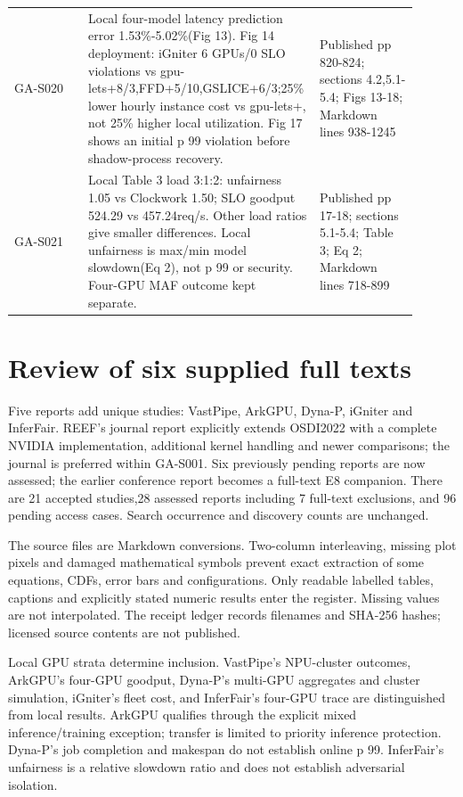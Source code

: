 \documentclass[12pt,a 4paper]{article}
\begin{document}
\begin{longtable}{P{0.18\linewidth}P{0.48\linewidth}P{0.24\linewidth}}
GA-S020 \cite{igniter} & Local four-model latency prediction error 1.53\%-5.02\%(Fig 13). Fig 14 deployment: iGniter 6 GPUs/0 SLO violations vs gpu-lets+8/3,FFD+5/10,GSLICE+6/3;25\% lower hourly instance cost vs gpu-lets+, not 25\% higher local utilization. Fig 17 shows an initial p 99 violation before shadow-process recovery. & Published pp 820-824; sections 4.2,5.1-5.4; Figs 13-18; Markdown lines 938-1245\\
GA-S021 \cite{inferfair} & Local Table 3 load 3:1:2: unfairness 1.05 vs Clockwork 1.50; SLO goodput 524.29 vs 457.24req/s. Other load ratios give smaller differences. Local unfairness is max/min model slowdown(Eq 2), not p 99 or security. Four-GPU MAF outcome kept separate. & Published pp 17-18; sections 5.1-5.4; Table 3; Eq 2; Markdown lines 718-899\\
\bottomrule\end{longtable}
\section{Review of six supplied full texts}
Five reports add unique studies: VastPipe, ArkGPU, Dyna-P, iGniter and InferFair. REEF's journal report explicitly extends OSDI2022 with a complete NVIDIA implementation, additional kernel handling and newer comparisons; the journal is preferred within GA-S001. Six previously pending reports are now assessed; the earlier conference report becomes a full-text E8 companion. There are 21 accepted studies,28 assessed reports including 7 full-text exclusions, and 96 pending access cases. Search occurrence and discovery counts are unchanged.

The source files are Markdown conversions. Two-column interleaving, missing plot pixels and damaged mathematical symbols prevent exact extraction of some equations, CDFs, error bars and configurations. Only readable labelled tables, captions and explicitly stated numeric results enter the register. Missing values are not interpolated. The receipt ledger records filenames and SHA-256 hashes; licensed source contents are not published.

Local GPU strata determine inclusion. VastPipe's NPU-cluster outcomes, ArkGPU's four-GPU goodput, Dyna-P's multi-GPU aggregates and cluster simulation, iGniter's fleet cost, and InferFair's four-GPU trace are distinguished from local results. ArkGPU qualifies through the explicit mixed inference/training exception; transfer is limited to priority inference protection. Dyna-P's job completion and makespan do not establish online p 99. InferFair's unfairness is a relative slowdown ratio and does not establish adversarial isolation.
\end{document}
